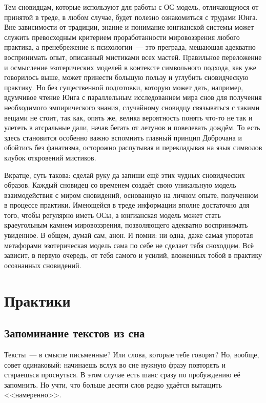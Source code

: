 \documentclass[a5paper,12pt,twoside]{memoir}
\begin{document}
Тем сновидцам, которые используют для работы с ОС модель, отличающуюся от принятой в треде, в любом случае, будет полезно ознакомиться с трудами Юнга. Вне зависимости от традиции, знание и понимание юнгианской системы может служить превосходным критерием проработанности мировоззрения любого практика, а пренебрежение к психологии~--- это преграда, мешающая адекватно воспринимать опыт, описанный мистиками всех мастей. Правильное переложение и осмысление эзотерических моделей в контексте символьного подхода, как уже говорилось выше, может принести большую пользу и углубить сновидческую практику. Но без существенной подготовки, которую может дать, например, вдумчивое чтение Юнга с параллельным исследованием мира снов для получения необходимого эмпирического знания, случайному сновидцу связываться с такими вещами не стоит, так как, опять же, велика вероятность понять что-то не так и улететь в атсральные дали, начав бегать от летунов и повелевать дождём. То есть здесь становится особенно важно вспомнить главный принцип Доброчана и обойтись без фанатизма, осторожно распутывая и перекладывая на язык символов клубок откровений мистиков.

Вкратце, суть такова: сделай руку да запиши ещё этих чудных сновидческих образов. Каждый сновидец со временем создаёт свою уникальную модель взаимодействия с миром сновидений, основанную на личном опыте, полученном в процессе практики. Имеющейся в треде информации вполне достаточно для того, чтобы регулярно иметь ОСы, а юнгианская модель может стать краеугольным камнем мировоззрения, позволяющего адекватно воспринимать увиденное. В общем, думай сам, анон. И помни: ни одна, даже самая упоротая метафорами эзотерическая модель сама по себе не сделает тебя сноходцем. Всё зависит, в первую очередь, от тебя самого и усилий, вложенных тобой в практику осознанных сновидений.




\part{Практики}


\chapter{Запоминание текстов из сна}
Тексты~--- в смысле письменные? Или слова, которые тебе говорят? 
Но, вообще, совет одинаковый: начинаешь вслух во сне нужную фразу повторять и стараешься проснуться. В этом случае есть шанс сразу по пробуждению её запомнить. Но учти, что больше десяти слов редко удаётся вытащить <<намеренно>>. 
\end{document}
